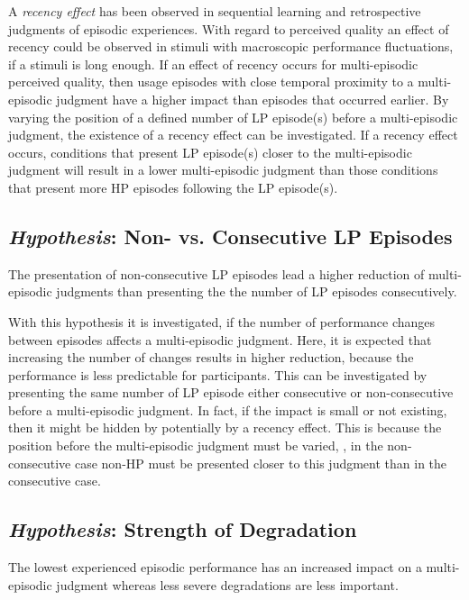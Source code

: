 A \emph{recency effect} has been observed in sequential learning and retrospective judgments of episodic experiences.
With regard to perceived quality an effect of recency could be observed in stimuli with macroscopic performance fluctuations, if a stimuli is long enough.
If an effect of recency occurs for multi-episodic perceived quality, then usage episodes with close temporal proximity to a multi-episodic judgment have a higher impact than episodes that occurred earlier.
By varying the position of a defined number of \ac{LP} episode(s) before a multi-episodic judgment, the existence of a recency effect can be investigated.
If a recency effect occurs, conditions that present \ac{LP} episode(s) closer to the multi-episodic judgment will result in a lower multi-episodic judgment than those conditions that present more \ac{HP} episodes following the \ac{LP} episode(s).

\subsection{\emph{Hypothesis}: Non- vs. Consecutive \acs{LP} Episodes}
\begin{hypothesis}\label{hypo:consecutive}
The presentation of non-consecutive \ac{LP} episodes lead a higher reduction of multi-episodic judgments than presenting the the number of \ac{LP} episodes consecutively.
\end{hypothesis}

With this hypothesis it is investigated, if the number of performance changes between episodes affects a multi-episodic judgment.
Here, it is expected that increasing the number of changes results in higher reduction, because the performance is less predictable for participants.
This can be investigated by presenting the same number of \ac{LP} episode either consecutive or non-consecutive before a multi-episodic judgment.
In fact, if the impact is small or not existing, then it might be hidden by potentially by a recency effect.
This is because the position before the multi-episodic judgment must be varied, \ie, in the non-consecutive case non-\ac{HP} must be presented closer to this judgment than in the consecutive case.

\subsection{\emph{Hypothesis}: Strength of Degradation}
\begin{hypothesis}\label{hypo:strength}
The lowest experienced episodic performance has an increased impact on a multi-episodic judgment whereas less severe degradations are less important.
\end{hypothesis}

